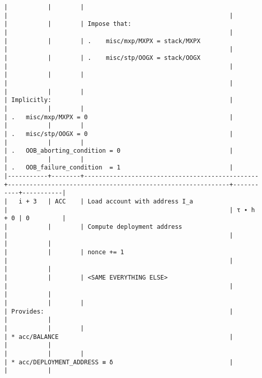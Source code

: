 \documentclass[varwidth=\maxdimen,margin=0.5cm,multi={verbatim}]{standalone}
\begin{document}
\begin{verbatim}
|           |        |                                                |                                                             |
|           |        | Impose that:                                   |                                                             |
|           |        | .    misc/mxp/MXPX = stack/MXPX                |                                                             |
|           |        | .    misc/stp/OOGX = stack/OOGX                |                                                             |
|           |        |                                                |                                                             |
|           |        |                                                | Implicitly:                                                 |
|           |        |                                                | .   misc/mxp/MXPX = 0                                       |
|           |        |                                                | .   misc/stp/OOGX = 0                                       |
|           |        |                                                | .   OOB_aborting_condition = 0                              |
|           |        |                                                | .   OOB_failure_condition  = 1                              |
|-----------+--------+------------------------------------------------+-------------------------------------------------------------+-----------+-----------|
|   i + 3   | ACC    | Load account with address I_a                  |                                                             | τ ∙ h + 0 | 0         |
|           |        | Compute deployment address                     |                                                             |           |           |
|           |        | nonce += 1                                     |                                                             |           |           |
|           |        | <SAME EVERYTHING ELSE>                         |                                                             |           |           |
|           |        |                                                | Provides:                                                   |           |           |
|           |        |                                                | * acc/BALANCE                                               |           |           |
|           |        |                                                | * acc/DEPLOYMENT_ADDRESS ≡ δ                                |           |           |

\end{verbatim}
\end{document}
